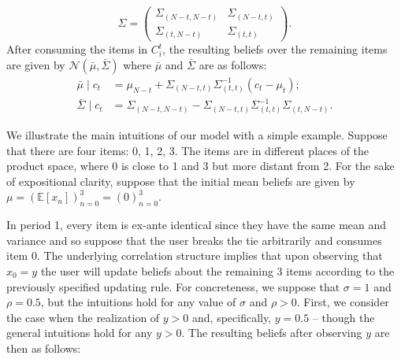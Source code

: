 \documentclass[manuscript]{acmart}
\newcommand{\xhdr}[1]{\vspace{1mm} \noindent{\bf #1}}
\begin{document}
\[ \Sigma =  \left( \begin{array}{cc}
\Sigma_{(N-t, N-t)} & \Sigma_{(N-t,t)} \\
\Sigma_{(t,N-t)} & \Sigma_{(t,t)}
\end{array} \right).
\]
After consuming the items in $C_{i}^{t}$, the resulting beliefs over the remaining items are given by $\mathcal{N}(\bar{\mu}, \bar{\Sigma})$ where $\bar{\mu}$ and $\bar{\Sigma}$ are as follows:
\begin{align*}
\bar{\mu} \mid c_t &= \mu_{N-t} + \Sigma_{(N-t,t)} \Sigma_{(t,t)}^{-1}(c_t - \mu_t); \\
\bar{\Sigma} \mid c_t &= \Sigma_{(N-t,N-t)} - \Sigma_{(N-t,t)} \Sigma_{(t,t)}^{-1} \Sigma_{(t,N-t)}.
\end{align*}

\xhdr{An Illustrative Example.} We illustrate the main intuitions of our model with a simple example. Suppose that there are four items: 0, 1, 2, 3. The items are in different places of the product space, where 0 is close to 1 and 3 but more distant from 2. For the sake of expositional clarity, suppose that the initial mean beliefs are given by $\mu=(\mathbb E[x_n])_{n=0}^3=(0)_{n=0}^3$.
\par
In period 1, every item is ex-ante identical since they have the same mean and variance and so suppose that the user breaks the tie arbitrarily and consumes item 0. The underlying correlation structure implies that upon observing that $x_0 = y$ the user will update beliefs about the remaining 3 items according to the previously specified updating rule. For concreteness, we suppose that $\sigma = 1$ and $\rho = 0.5$, but the intuitions hold for any value of $\sigma$ and $\rho > 0$. First, we consider the case when the realization of $y > 0$ and, specifically, $y = 0.5$ -- though the general intuitions hold for any $y > 0$. The resulting beliefs after observing $y$ are then as follows:
\end{document}
